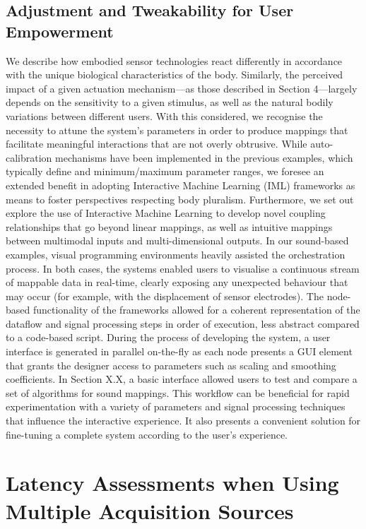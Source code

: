 \subsection{Adjustment and Tweakability for User Empowerment}
We describe how embodied sensor technologies react differently in accordance with the unique biological characteristics of the body. Similarly, the perceived impact of a given actuation mechanism—as those described in Section 4—largely depends on the sensitivity to a given stimulus, as well as the natural bodily variations between different users. With this considered, we recognise the necessity to attune the system’s parameters in order to produce mappings that facilitate meaningful interactions that are not overly obtrusive. While auto-calibration mechanisms have been implemented in the previous examples, which typically define and minimum/maximum parameter ranges, we foresee an extended benefit in adopting Interactive Machine Learning (IML) \cite{fails_interactive_2003,amershi_power_2014} frameworks as means to foster perspectives respecting body pluralism. Furthermore, we set out explore the use of Interactive Machine Learning to develop novel coupling relationships that go beyond linear mappings, as well as intuitive mappings between multimodal inputs and multi-dimensional outputs. In our sound-based examples, visual programming environments heavily assisted the orchestration process. In both cases, the systems enabled users to visualise a continuous stream of mappable data in real-time, clearly exposing any unexpected behaviour that may occur (for example, with the displacement of sensor electrodes). The node-based functionality of the frameworks allowed for a coherent representation of the dataflow and signal processing steps in order of execution, less abstract compared to a code-based script. During the process of developing the system, a user interface is generated in parallel on-the-fly as each node presents a GUI element that grants the designer access to parameters such as scaling and smoothing coefficients. In Section X.X, a basic interface allowed users to test and compare a set of algorithms for sound mappings. This workflow can be beneficial for rapid experimentation with a variety of parameters and signal processing techniques that influence the interactive experience. It also presents a convenient solution for fine-tuning a complete system according to the user’s experience.

\section{Latency Assessments when Using Multiple Acquisition Sources}

